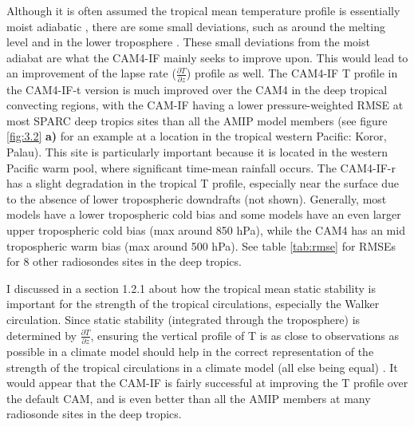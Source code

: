 \documentclass[letterpaper,12pt,titlepage,oneside,final]{book}
\begin{document}
Although it is often assumed the tropical mean temperature profile is essentially moist adiabatic \citep{emanuel_quasi-equilibrium_2007}, there are some small deviations, such as around the melting level and in the lower troposphere \citep{folkins_melting_2013}. These small deviations from the moist adiabat are what the CAM4-IF mainly seeks to improve upon. This would lead to an improvement of the lapse rate ($\frac{\partial{T}}{\partial{z}}$) profile as well. 
The CAM4-IF T profile in the CAM4-IF-t version is much improved over the CAM4 in the deep tropical convecting regions, with the CAM-IF having a lower pressure-weighted RMSE at most SPARC deep tropics sites than all the AMIP model members (see figure \ref{fig:3.2} \textbf{a)} for an example at a location in the tropical western Pacific: Koror, Palau). This site is particularly important because it is located in the western Pacific warm pool, where significant time-mean rainfall occurs. The CAM4-IF-r has a slight degradation in the tropical T profile, especially near the surface due to the absence of lower tropospheric downdrafts (not shown). Generally, most models have a lower tropospheric cold bias and some models have an even larger upper tropospheric cold bias (max around 850 hPa), while the CAM4 has an mid tropospheric warm bias (max around 500 hPa). See table \ref{tab:rmse} for RMSEs for 8 other radiosondes sites in the deep tropics.

I discussed in a section 1.2.1 about how the tropical mean static stability is important for the strength of the tropical circulations, especially the Walker circulation. Since static stability (integrated through the troposphere) is determined by $\frac{\partial{T}}{\partial{z}}$, ensuring the vertical profile of T is as close to observations as possible in a climate model should help in the correct representation of the strength of the tropical circulations in a climate model (all else being equal) \citep{sohn_role_2016,mitas_recent_2006}. It would appear that the CAM-IF is fairly successful at improving the T profile over the default CAM, and is even better than all the AMIP members at many radiosonde sites in the deep tropics. 
\end{document}
